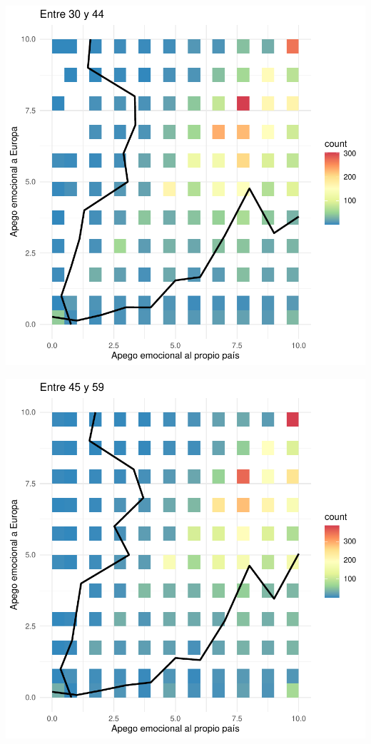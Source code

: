 \documentclass{article}
\begin{document}
\includegraphics{Informe-008}

\includegraphics{Informe-009}
\end{document}
